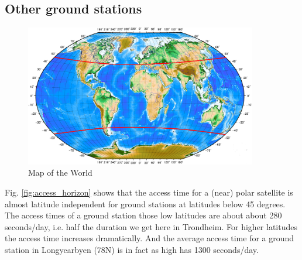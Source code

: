 \subsection{Other ground stations}
\begin{figure}
  \begin{center}
    \includegraphics[width=0.9\textwidth]{Figures/verdenskart}
  \end{center}
  \caption[world]{Map of the World}
  \label{fig:world}
\end{figure}

Fig. \ref{fig:access_horizon} shows that the access time for a (near) polar satellite is almost latitude independent for ground stations at latitudes below 45 degrees. The access times of a ground station those low latitudes are about about 280 seconds/day, i.e. half the duration we get here in Trondheim. For higher latitudes the access time increases dramatically. And the average access time for a ground station in Longyearbyen (78N) is in fact as high has 1300 seconds/day.
